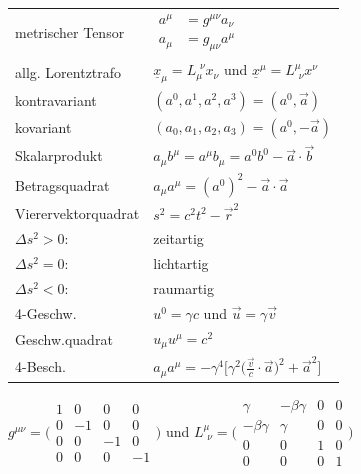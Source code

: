 \documentclass[12pt,a4paper]{article}
\renewcommand{\=}[1]{\stackrel{#1}{=}}
\theoremstyle{definition}
\theoremstyle{remark}
\begin{document}
\begin{center}
\begin{minipage}[t]{.45\linewidth}
\end{minipage}%
\begin{minipage}[t]{.5\linewidth}
\vspace{0pt}
\centering
\begin{tabular}{ll}
metrischer Tensor & $\begin{aligned} a^{\mu} &= g^{\mu \nu} a_{\nu}\\ a_{\mu} &= g_{\mu \nu} a^{\mu}\end{aligned}$\\
allg. Lorentztrafo & $\underline{x}_{\mu} = L_{\mu}^{\,\ \nu} x_{\nu}$ und $\underline{x}^{\mu} = L^{\mu}_{\,\ \nu} x^{\nu}$\\
kontravariant & {\small $(a^0, a^1, a^2, a^3) = (a^0, \vec{a})$}\\
kovariant &  {\small $(a_0, a_1, a_2, a_3) = (a^0, -\vec{a})$}\\
Skalarprodukt & $a_{\mu} b^{\mu} = a^{\mu}b_{\mu} = a^0b^0 - \vec{a} \cdot \vec{b}$\\
Betragsquadrat & $a_{\mu} a^{\mu} = (a^0)^2 - \vec{a} \cdot \vec{a}$\\
Vierervektorquadrat & $s^2 = c^2 t^2 - \vec{r}^2$\\
$\Delta s^2 > 0$: & zeitartig\\
$\Delta s^2 = 0$: & lichtartig\\
$\Delta s^2 < 0$: & raumartig\\
4-Geschw. & $u^0 = \gamma c$ und $\vec{u} = \gamma \vec{v}$\\
Geschw.quadrat & $u_{\mu} u^{\mu} = c^2$\\
4-Besch. & $a_{\mu} a^{\mu} = -\gamma^4 \Big[\gamma^2 \Big( \frac{\vec{v}}{c} \cdot \vec{a} \Big)^2 + \vec{a}^2 \Big]$\\
\end{tabular}

$g^{\mu \nu} =
\Bigg(\begin{smallmatrix}
1 & 0 & 0 & 0\\
0 & -1 & 0 & 0\\
0 & 0 & -1 & 0\\
0 & 0 & 0 & -1
\end{smallmatrix}\Bigg)$
und $L^{\mu}_{\,\ \nu} = \Bigg(\begin{smallmatrix}
\gamma & -\beta \gamma & 0 & 0\\
-\beta \gamma & \gamma & 0 & 0\\
0 & 0 & 1 & 0\\
0 & 0 & 0 & 1
\end{smallmatrix}\Bigg)$\\


\end{minipage}
\end{center}
\end{document}
